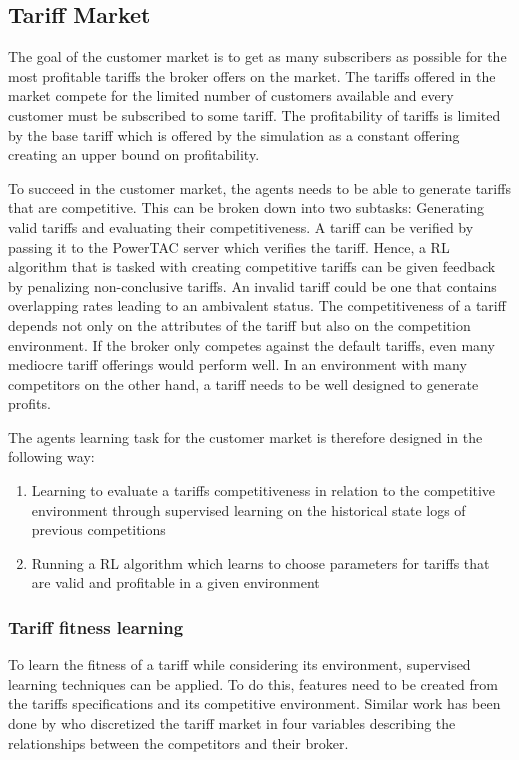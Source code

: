 {\subsection{Tariff Market}

The goal of the customer market is to get as many subscribers as possible for the most profitable tariffs the broker
offers on the market. The tariffs offered in the market compete for the limited number of customers available and every
customer must be subscribed to some tariff. The profitability of tariffs is limited by the base tariff which is offered
by the simulation as a constant offering creating an upper bound on profitability. 

To succeed in the customer market, the agents needs to be able to generate tariffs that are competitive. This can be
broken down into two subtasks: Generating valid tariffs and evaluating their competitiveness. A tariff can be verified
by passing it to the \ac {PowerTAC} server which verifies the tariff. Hence, a \ac {RL} algorithm that is tasked with
creating competitive tariffs can be given feedback by penalizing non-conclusive tariffs. An invalid tariff could be one
that contains overlapping rates leading to an ambivalent status. The competitiveness of a tariff depends not only on the
attributes of the tariff but also on the competition environment. If the broker only competes against the default
tariffs, even many mediocre tariff offerings would perform well. In an environment with many competitors on the other
hand, a tariff needs to be well designed to generate profits. 

The agents learning task for the customer market is therefore designed in the following way:

\begin{enumerate} \item Learning to evaluate a tariffs competitiveness in relation to the competitive environment
	through supervised learning on the historical state logs of previous competitions \item Running a \ac {RL}
	algorithm which learns to choose parameters for tariffs that are valid and profitable in a given environment
\end{enumerate}

\subsubsection{Tariff fitness learning} To learn the fitness of a tariff while considering its environment, supervised
learning techniques can be applied. To do this, features need to be created from the tariffs specifications and its
competitive environment. Similar work has been done by \citep{cuevas2015distributed} who discretized the tariff market
in four variables describing the relationships between the competitors and their broker.   

}
